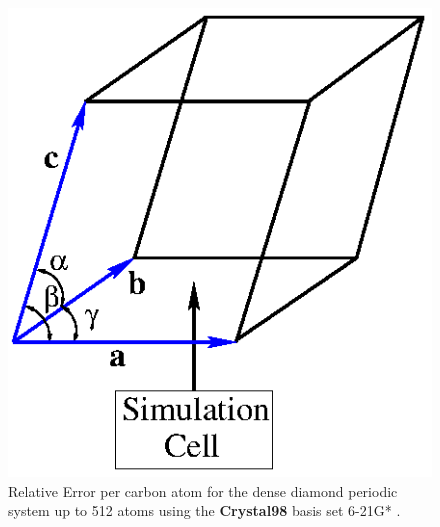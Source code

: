 \documentclass[prb,aps,nobibnotes,twocolumn,doublespace,twocolumngrid,superbib]{revtex4}
\begin{document}
%
%
%
\begin{figure}
\caption{ Relative Error per carbon atom for the dense diamond
periodic system up to 512 atoms using the {\bf Crystal98} basis set 6-21G* \cite{C98Basis}.}
\label{figure:ErrorPerN}
{\centering \includegraphics{UnitCell_2.ps} \par} 
\end{figure}
\end{document}
